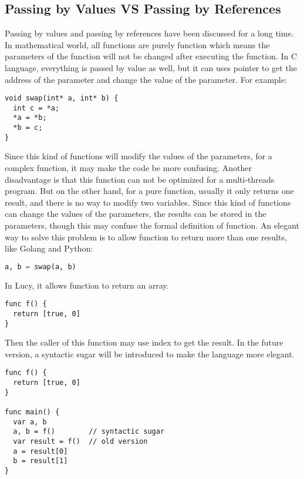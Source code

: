 \subsection{Passing by Values VS Passing by References}
Passing by values and passing by references have been discussed for a long time. In mathematical world, all functions are purely function which means the parameters of the function will not be changed after executing the function. In C language, everything is passed by value as well, but it can uses pointer to get the address of the parameter and change the value of the parameter. For example:
\begin{lstlisting}
void swap(int* a, int* b) {
  int c = *a;
  *a = *b;
  *b = c;
}
\end{lstlisting}
Since this kind of functions will modify the values of the parameters, for a complex function, it may make the code be more confusing. Another disadvantage is that this function can not be optimized for a multi-threads program. But on the other hand, for a pure function, usually it only returns one result, and there is no way to modify two variables. Since this kind of functions can change the values of the parameters, the results can be stored in the parameters, though this may confuse the formal definition of function. An elegant way to solve this problem is to allow function to return more than one results, like Golang and Python:
\begin{lstlisting}[language=python]
a, b = swap(a, b)
\end{lstlisting}
In Lucy, it allows function to return an array.
\begin{lstlisting}
func f() {
  return [true, 0]
}
\end{lstlisting}
Then the caller of this function may use index to get the result. In the future version, a syntactic sugar will be introduced to make the language more elegant.
\begin{lstlisting}
func f() {
  return [true, 0]
}

func main() {
  var a, b
  a, b = f()        // syntactic sugar
  var result = f()  // old version
  a = result[0]
  b = result[1]
}
\end{lstlisting}

